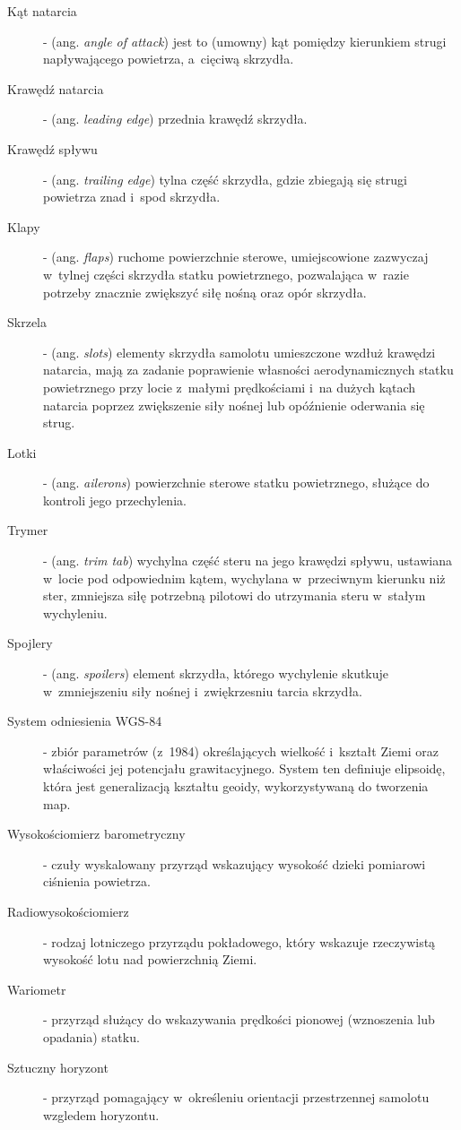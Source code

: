 \documentclass{mwrep}
\begin{document}
\begin{description}
\item[Kąt natarcia] - (ang. \emph{angle of attack}) jest to (umowny) kąt pomiędzy kierunkiem strugi napływającego powietrza, a~cięciwą skrzydła.
\item[Krawędź natarcia] - (ang. \emph{leading edge}) przednia krawędź skrzydła.
\item[Krawędź spływu] - (ang. \emph{trailing edge}) tylna część skrzydła, gdzie zbiegają się strugi powietrza znad i~spod skrzydła.
\item[Klapy] - (ang. \emph{flaps}) ruchome powierzchnie sterowe, umiejscowione zazwyczaj w~tylnej części skrzydła statku powietrznego, pozwalająca w~razie potrzeby znacznie zwiększyć siłę nośną oraz opór skrzydła.
\item[Skrzela] - (ang. \emph{slots}) elementy skrzydła samolotu umieszczone wzdłuż krawędzi natarcia, mają za zadanie poprawienie własności aerodynamicznych statku powietrznego przy locie z~małymi prędkościami i~na dużych kątach natarcia poprzez zwiększenie siły nośnej lub opóźnienie oderwania się strug.
\item[Lotki] - (ang. \emph{ailerons}) powierzchnie sterowe statku powietrznego, służące do kontroli jego przechylenia.
\item[Trymer] - (ang. \emph{trim tab}) wychylna część steru na jego krawędzi spływu, ustawiana w~locie pod odpowiednim kątem, wychylana w~przeciwnym kierunku niż ster, zmniejsza siłę potrzebną pilotowi do utrzymania steru w~stałym wychyleniu.
\item[Spojlery] - (ang. \emph{spoilers}) element skrzydła, którego wychylenie skutkuje w~zmniejszeniu siły nośnej i~zwiękrzesniu tarcia skrzydła.
\item[System odniesienia WGS-84] - zbiór parametrów (z~1984) określających wielkość i~kształt Ziemi oraz właściwości jej potencjału grawitacyjnego. System ten definiuje elipsoidę, która jest generalizacją kształtu geoidy, wykorzystywaną do tworzenia map.
\item[Wysokościomierz barometryczny] - czuły wyskalowany przyrząd wskazujący wysokość dzieki pomiarowi ciśnienia powietrza.
\item[Radiowysokościomierz] - rodzaj lotniczego przyrządu pokładowego, który wskazuje rzeczywistą wysokość lotu nad powierzchnią Ziemi.
\item[Wariometr] - przyrząd służący do wskazywania prędkości pionowej (wznoszenia lub opadania) statku.
\item[Sztuczny horyzont] - przyrząd pomagający w~określeniu orientacji przestrzennej samolotu wzgledem horyzontu.

\end{description}
\end{document}
